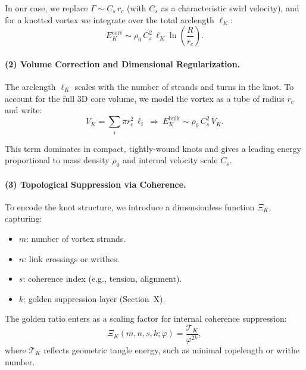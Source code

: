 \documentclass[12pt]{article}
\begin{document}
    In our case, we replace $\Gamma \sim C_s\, r_c$ (with $C_s$ as a characteristic swirl velocity), and for a knotted vortex we integrate over the total arclength $\ell_K$:
    \begin{equation}
        E_K^{\text{core}} \sim \rho_0\, C_s^2\, \ell_K \ln\left(\frac{R}{r_c}\right).
    \end{equation}

    \vspace{0.5em}
    \paragraph{(2) Volume Correction and Dimensional Regularization.}
    The arclength $\ell_K$ scales with the number of strands and turns in the knot. To account for the full 3D core volume, we model the vortex as a tube of radius $r_c$ and write:
    \begin{equation}
        V_K = \sum_i \pi r_c^2\, \ell_i \ \Rightarrow\
        E_K^{\text{bulk}} \sim \rho_0\, C_s^2\, V_K.
    \end{equation}

    This term dominates in compact, tightly-wound knots and gives a leading energy proportional to mass density $\rho_0$ and internal velocity scale $C_s$.

    \vspace{0.5em}
    \paragraph{(3) Topological Suppression via Coherence.}
    To encode the knot structure, we introduce a dimensionless function $\Xi_K$, capturing:
    \begin{itemize}
        \item $m$: number of vortex strands.
        \item $n$: link crossings or writhes.
        \item $s$: coherence index (e.g., tension, alignment).
        \item $k$: golden suppression layer (Section~X).
    \end{itemize}

    The golden ratio enters as a scaling factor for internal coherence suppression:
    \begin{equation}
        \Xi_K(m,n,s,k;\varphi) = \frac{\mathcal{T}_{K}}{\varphi^{2k}},
    \end{equation}
    where $\mathcal{T}_K$ reflects geometric tangle energy, such as minimal ropelength or writhe number.
\end{document}

